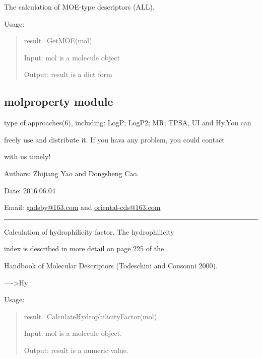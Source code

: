 \documentclass[letterpaper,10pt,english]{sphinxmanual}
\begin{document}

\begin{fulllineitems}
\label{reference/moe:moe.GetMOE}
The calculation of MOE-type descriptors (ALL).

Usage:
\begin{quote}

result=GetMOE(mol)

Input: mol is a molecule object

Output: result is a dict form
\end{quote}

\end{fulllineitems}



\subsection{molproperty module}
\label{reference/molproperty:module-molproperty}\label{reference/molproperty::doc}\label{reference/molproperty:molproperty-module}
type of approaches(6), including: LogP; LogP2; MR; TPSA, UI and Hy.You can

freely use and distribute it. If you hava  any problem, you could contact

with us timely!

Authors: Zhijiang Yao and Dongsheng Cao.

Date: 2016.06.04

Email: \href{mailto:gadsby@163.com}{gadsby@163.com} and \href{mailto:oriental-cds@163.com}{oriental-cds@163.com}


\bigskip\hrule{}\bigskip


\begin{fulllineitems}
\label{reference/molproperty:molproperty.CalculateHydrophilicityFactor}
Calculation of hydrophilicity factor. The hydrophilicity

index is described in more detail on page 225 of the

Handbook of Molecular Descriptors (Todeschini and Consonni 2000).

----\textgreater{}Hy

Usage:
\begin{quote}

result=CalculateHydrophilicityFactor(mol)

Input: mol is a molecule object.

Output: result is a numeric value.
\end{quote}

\end{fulllineitems}
\end{document}
